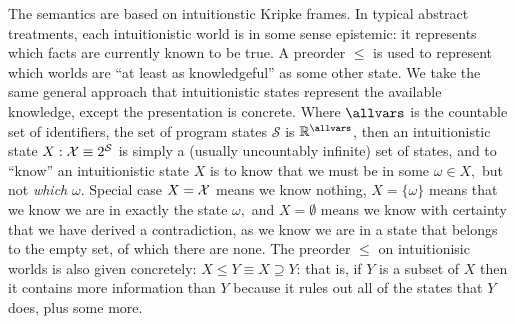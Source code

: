 \documentclass[12pt]{cmuthesis}
\theoremstyle{definition}
\theoremstyle{remark}
\newcommand{\allstate}{\mathcal{S}}
\newcommand{\allregion}{\mathcal{X}}
\begin{document}
The semantics are based on intuitionstic Kripke frames.
In typical abstract treatments, each intuitionistic world is in some sense epistemic: it represents which facts are currently known to be true.
A preorder $\leq$ is used to represent which worlds are ``at least as knowledgeful'' as some other state.
We take the same general approach that intuitionistic states represent the available knowledge, except the presentation is concrete.
Where $\allvars$ is the countable set of identifiers, the set of program states $\allstate$ is $\mathbb{R}^\allvars$, then an intuitionistic state $X : \allcon \equiv 2^\allstate$ is simply a (usually uncountably infinite) set of states, and to ``know'' an intuitionistic state $X$ is to know that we must be in some $\omega \in X,$ but not \emph{which} $\omega$.
Special case $X = \allcon$ means we know nothing, $X = \{\omega\}$ means that we know we are in exactly the state $\omega,$ and $X = \emptyset$ means we know with certainty that we have derived a contradiction, as we know we are in a state that belongs to the empty set, of which there are none.
The preorder $\leq$ on intuitionisic worlds is also given concretely: $X \leq Y \equiv X \supseteq Y$: that is, if $Y$ is a subset of $X$ then it contains more information than $Y$ because it rules out all of the states that $Y$ does, plus some more.

\end{document}
